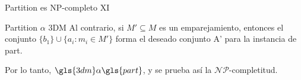 \documentclass[10pt, mathserif, profesionalfont]{beamer}
\begin{document}
\begin{frame}{Partition es NP-completo XI}
    
\begin{block}{Partition $\alpha$ 3DM}  
Al contrario, si \(M'\subseteq M\) es un emparejamiento, entonces el conjunto \(\{b_1\} \cup \{a_i:m_i\in M'\}\) forma el deseado conjunto A' para la instancia de \gls{part}. \par
\end{block}

\begin{block}{}
Por lo tanto, \(\gls{3dm} \alpha \gls{part}\), y se prueba así la $\mathcal{NP}$-completitud.
\end{block}
\end{frame}
\end{document}
